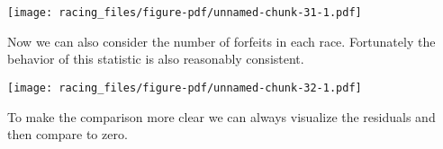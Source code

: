 \documentclass[
  letterpaper,
  DIV=11,
  numbers=noendperiod]{scrartcl}
\newenvironment{Shaded}{\begin{snugshade}}{\end{snugshade}}
\newcommand{\AttributeTok}[1]{\textcolor[rgb]{0.40,0.45,0.13}{#1}}
\newcommand{\ControlFlowTok}[1]{\textcolor[rgb]{0.00,0.23,0.31}{#1}}
\newcommand{\DecValTok}[1]{\textcolor[rgb]{0.68,0.00,0.00}{#1}}
\newcommand{\FunctionTok}[1]{\textcolor[rgb]{0.28,0.35,0.67}{#1}}
\newcommand{\NormalTok}[1]{\textcolor[rgb]{0.00,0.23,0.31}{#1}}
\newcommand{\OtherTok}[1]{\textcolor[rgb]{0.00,0.23,0.31}{#1}}
\newcommand{\SpecialCharTok}[1]{\textcolor[rgb]{0.37,0.37,0.37}{#1}}
\newcommand{\StringTok}[1]{\textcolor[rgb]{0.13,0.47,0.30}{#1}}
\begin{document}
\texttt{[image: racing\_files/figure-pdf/unnamed-chunk-31-1.pdf]}

Now we can also consider the number of forfeits in each race.
Fortunately the behavior of this statistic is also reasonably
consistent.

\begin{Shaded}
\end{Shaded}

\texttt{[image: racing\_files/figure-pdf/unnamed-chunk-32-1.pdf]}

To make the comparison more clear we can always visualize the residuals
and then compare to zero.
\end{document}
